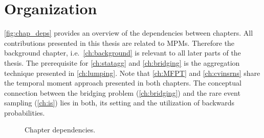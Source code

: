 \section{Organization}
\autoref{fig:chap_deps} provides an overview of the dependencies between chapters.
All contributions presented in this thesis are related to \aclp{MPM}.
Therefore the background chapter, i.e.\ \autoref{ch:background} is relevant
to all later parts of the thesis.
The prerequisite for \autoref{ch:statagg} and \autoref{ch:bridging} is the aggregation
technique presented in \autoref{ch:lumping}.
Note that \autoref{ch:MFPT} and \autoref{ch:cvinsrns} share the temporal moment approach presented
in both chapters.
The conceptual connection between the bridging problem (\autoref{ch:bridging}) and the rare event sampling (\autoref{ch:is}) lies in both, its setting and the utilization of backwards probabilities.
\begin{figure}[htb]
	\centering
{}
	\caption{\label{fig:chap_deps}Chapter dependencies.}
\end{figure}


